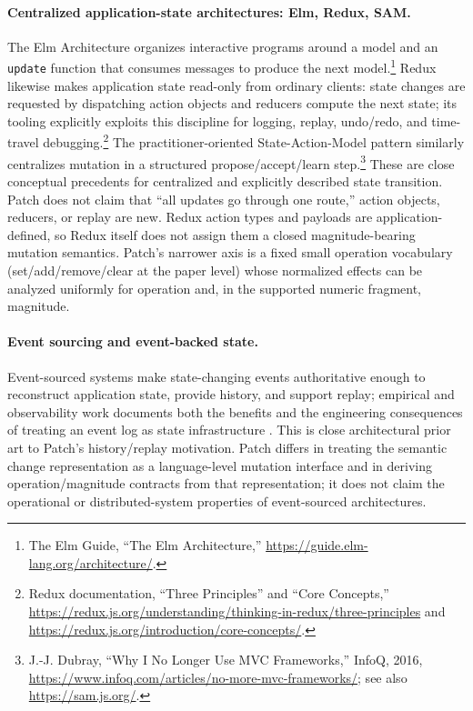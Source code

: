 \paragraph{Centralized application-state architectures: Elm, Redux, SAM.}
The Elm Architecture organizes interactive programs around a model and an \texttt{update} function that consumes messages to produce the next model.\footnote{The Elm Guide, ``The Elm Architecture,'' \url{https://guide.elm-lang.org/architecture/}.} Redux likewise makes application state read-only from ordinary clients: state changes are requested by dispatching action objects and reducers compute the next state; its tooling explicitly exploits this discipline for logging, replay, undo/redo, and time-travel debugging.\footnote{Redux documentation, ``Three Principles'' and ``Core Concepts,'' \url{https://redux.js.org/understanding/thinking-in-redux/three-principles} and \url{https://redux.js.org/introduction/core-concepts/}.} The practitioner-oriented State-Action-Model pattern similarly centralizes mutation in a structured propose/accept/learn step.\footnote{J.-J. Dubray, ``Why I No Longer Use MVC Frameworks,'' InfoQ, 2016, \url{https://www.infoq.com/articles/no-more-mvc-frameworks/}; see also \url{https://sam.js.org/}.} These are close conceptual precedents for centralized and explicitly described state transition. Patch does not claim that ``all updates go through one route,'' action objects, reducers, or replay are new. Redux action types and payloads are application-defined, so Redux itself does not assign them a closed magnitude-bearing mutation semantics. Patch's narrower axis is a fixed small operation vocabulary (set/add/remove/clear at the paper level) whose normalized effects can be analyzed uniformly for operation and, in the supported numeric fragment, magnitude.

\paragraph{Event sourcing and event-backed state.}
Event-sourced systems make state-changing events authoritative enough to reconstruct application state, provide history, and support replay; empirical and observability work documents both the benefits and the engineering consequences of treating an event log as state infrastructure \cite{overeem2021eventsourcing,lima2021observability}. This is close architectural prior art to Patch's history/replay motivation. Patch differs in treating the semantic change representation as a language-level mutation interface and in deriving operation/magnitude contracts from that representation; it does not claim the operational or distributed-system properties of event-sourced architectures.

